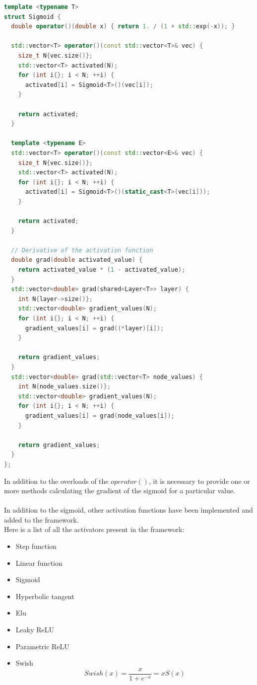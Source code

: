 \documentclass[12pt]{article}
\begin{document}
\begin{lstlisting}[language=C++]
template <typename T>
struct Sigmoid {
  double operator()(double x) { return 1. / (1 + std::exp(-x)); }

  std::vector<T> operator()(const std::vector<T>& vec) {
	size_t N{vec.size()};
	std::vector<T> activated(N);
	for (int i{}; i < N; ++i) {
	  activated[i] = Sigmoid<T>()(vec[i]);
	}
	
	return activated;
  }

  template <typename E>
  std::vector<T> operator()(const std::vector<E>& vec) {
	size_t N{vec.size()};
	std::vector<T> activated(N);
	for (int i{}; i < N; ++i) {
	  activated[i] = Sigmoid<T>()(static_cast<T>(vec[i]));
	}
	
	return activated;
  }

  // Derivative of the activation function
  double grad(double activated_value) {
	return activated_value * (1 - activated_value);
  }
  std::vector<double> grad(shared<Layer<T>> layer) {
	int N{layer->size()};
	std::vector<double> gradient_values(N);
	for (int i{}; i < N; ++i) {
	  gradient_values[i] = grad((*layer)[i]);
	}

	return gradient_values;
  }
  std::vector<double> grad(std::vector<T> node_values) {
	int N{node_values.size()};
	std::vector<double> gradient_values(N);
	for (int i{}; i < N; ++i) {
	  gradient_values[i] = grad(node_values[i]);
	}

	return gradient_values;
  }
};
\end{lstlisting}
In addition to the overloads of the $operator()$, it is necessary to provide one or more methods calculating
the gradient of the sigmoid for a particular value. \\ \\
In addition to the sigmoid, other activation functions have been implemented and added to the framework. \\
Here is a list of all the activators present in the framework:
\begin{itemize}
  \item Step function
  \item Linear function
  \item Sigmoid 
  \item Hyperbolic tangent
  \item Elu
  \item Leaky ReLU
  \item Parametric ReLU
  \item Swish
  $$
	Swish(x) = \frac{x}{1 + e^{-x}} = x S(x)
  $$	
\end{itemize}
\end{document}
